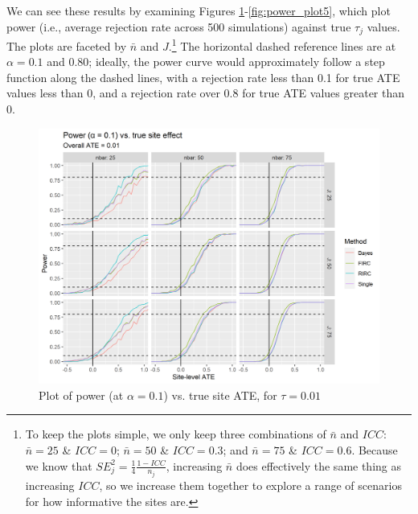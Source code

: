 \documentclass[]{article}
\begin{document}
We can see these results by examining Figures \ref{fig:power_plot01}-\ref{fig:power_plot5}, which plot power (i.e., average rejection rate across 500 simulations) against true $\tau_j$ values.
The plots are faceted by $\bar{n}$ and $J$.\footnote{To keep the plots simple, we only keep three combinations of $\bar{n}$ and $ICC$: $\bar{n} = 25$ \& $ICC = 0$; $\bar{n} = 50$ \& $ICC = 0.3$; and $\bar{n} = 75$ \& $ICC = 0.6$.
Because we know that $SE_j^2 = \frac{1}{4} \frac{1-ICC}{n_j}$, increasing $\bar{n}$ does effectively the same thing as increasing $ICC$, so we increase them together to explore a range of scenarios for how informative the sites are.}
The horizontal dashed reference lines are at $\alpha = 0.1$ and $0.80$; ideally, the power curve would approximately follow a step function along the dashed lines, with a rejection rate less than 0.1 for true ATE values less than 0, and a rejection rate over 0.8 for true ATE values greater than 0.

\begin{figure}[ht]
	\centering
	\includegraphics[width=\textwidth]{power_plot_01}
	\caption{Plot of power (at $\alpha = 0.1$) vs. true site ATE, for $\tau = 0.01$}
	\label{fig:power_plot01}
\end{figure}
\end{document}
